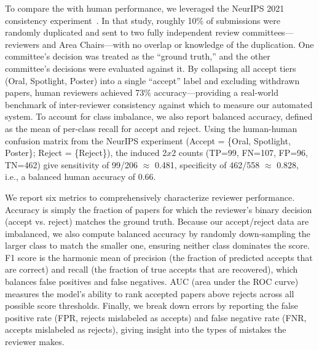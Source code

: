\begin{appendices}
To compare the \ourreviewer with human performance, we leveraged the NeurIPS 2021 consistency experiment~\citep{beygelzimer2021neurips}.
In that study, roughly 10\% of submissions were randomly duplicated and sent to two fully independent review committees—reviewers and Area Chairs—with no overlap or knowledge of the duplication.
One committee's decision was treated as the ``ground truth,'' and the other committee's decisions were evaluated against it.
By collapsing all accept tiers (Oral, Spotlight, Poster) into a single ``accept'' label and excluding withdrawn papers, human reviewers achieved 73\% accuracy—providing a real-world benchmark of inter-reviewer consistency against which to measure our automated system.
To account for class imbalance, we also report balanced accuracy, defined as the mean of per-class recall for accept and reject.
Using the human-human confusion matrix from the NeurIPS experiment (Accept = \{Oral, Spotlight, Poster\}; Reject = \{Reject\}), the induced 2$x$2 counts (TP=99, FN=107, FP=96, TN=462) give sensitivity of 99/206 $\approx$ 0.481, specificity of 462/558 $\approx$ 0.828, i.e., a balanced human accuracy of 0.66.


We report six metrics to comprehensively characterize reviewer performance.
Accuracy is simply the fraction of papers for which the reviewer's binary decision (accept vs. reject) matches the ground truth.
Because our accept/reject data are imbalanced, we also compute balanced accuracy by randomly down‐sampling the larger class to match the smaller one, ensuring neither class dominates the score.
F1 score is the harmonic mean of precision (the fraction of predicted accepts that are correct) and recall (the fraction of true accepts that are recovered), which balances false positives and false negatives.
AUC (area under the ROC curve) measures the model's ability to rank accepted papers above rejects across all possible score thresholds.
Finally, we break down errors by reporting the false positive rate (FPR, rejects mislabeled as accepts) and false negative rate (FNR, accepts mislabeled as rejects), giving insight into the types of mistakes the reviewer makes.


\end{appendices}
